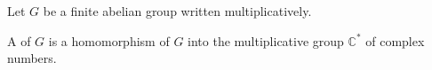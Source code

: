 Let $G$ be a finite abelian group written multiplicatively.

A  of $G$ is a homomorphism of $G$ into the multiplicative group $\mathbb{C}^*$ of complex numbers.

